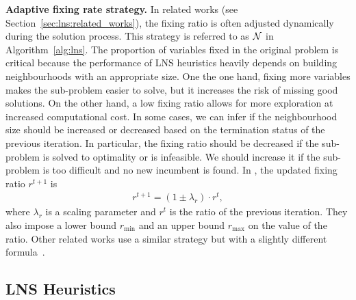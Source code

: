 \documentclass[3p, authoryear, times]{elsarticle}
\begin{document}
\textbf{Adaptive fixing rate strategy. } In related works (see Section~\ref{sec:lns:related_works}), the fixing ratio is often adjusted dynamically during the solution process. This strategy is referred to as $\mathcal{N}$ in Algorithm~\ref{alg:lns}. The proportion of variables fixed in the original problem is critical because the performance of LNS heuristics heavily depends on building neighbourhoods with an appropriate size. One the one hand, fixing more variables makes the sub-problem easier to solve, but it increases the risk of missing good solutions. On the other hand, a low fixing ratio allows for more exploration at increased computational cost. In some cases, we can infer if the neighbourhood size should be increased or decreased based on the termination status of the previous iteration. In particular, the fixing ratio should be decreased if the sub-problem is solved to optimality or is infeasible. We should increase it if the sub-problem is too difficult and no new incumbent is found. In \cite{chmiela_online_2023}, the updated fixing ratio $r^{t+1}$ is 
\begin{align}
    r^{t+1} = (1 \pm \lambda_r ) \cdot r^{t}, \label{eq:updateratio}
\end{align}
where $\lambda_r$ is a scaling parameter and $r^{t}$ is the ratio of the previous iteration. They also impose a lower bound $r_{\text{min}}$ and an upper bound $r_{\text{max}}$ on the value of the ratio.  Other related works use a similar strategy but with a slightly different formula~\citep{hendel_adaptive_2022, huang_local_2023}. 

\subsection{LNS Heuristics}\label{sec:lns_heuristics}
\end{document}
